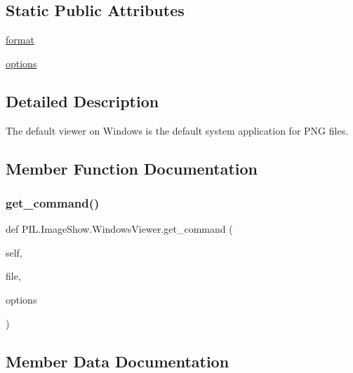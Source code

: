 \subsection*{Static Public Attributes}
\begin{DoxyCompactItemize}
\item 
\hyperlink{classPIL_1_1ImageShow_1_1WindowsViewer_aa4bcd33bd8f286cd7050fd8185dfe3b1}{format}
\item 
\hyperlink{classPIL_1_1ImageShow_1_1WindowsViewer_affe3b08113fb968b6effd1272b5c8bd9}{options}
\end{DoxyCompactItemize}


\subsection{Detailed Description}
\begin{DoxyVerb}The default viewer on Windows is the default system application for PNG files.\end{DoxyVerb}
 

\subsection{Member Function Documentation}
\mbox{\label{classPIL_1_1ImageShow_1_1WindowsViewer_a9fc5b7fc61ba8b2e2348b64827dacde8}} 
\subsubsection{\texorpdfstring{get\+\_\+command()}{get\_command()}}
{\footnotesize\ttfamily def P\+I\+L.\+Image\+Show.\+Windows\+Viewer.\+get\+\_\+command (\begin{DoxyParamCaption}\item[{}]{self,  }\item[{}]{file,  }\item[{}]{options }\end{DoxyParamCaption})}



\subsection{Member Data Documentation}
\mbox{\label{classPIL_1_1ImageShow_1_1WindowsViewer_aa4bcd33bd8f286cd7050fd8185dfe3b1}} 

